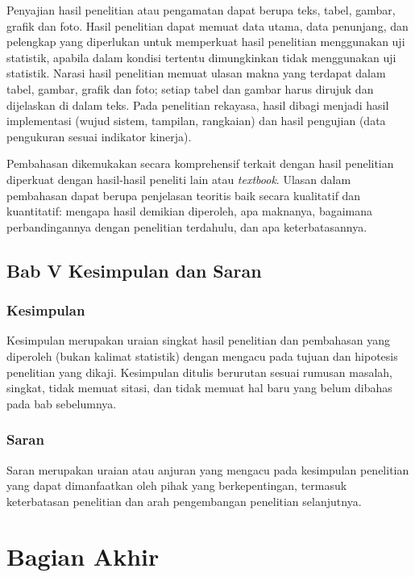 Penyajian hasil penelitian atau pengamatan dapat berupa teks, tabel, gambar, grafik dan foto. Hasil penelitian dapat memuat data utama, data penunjang, dan pelengkap yang diperlukan untuk memperkuat hasil penelitian menggunakan uji statistik, apabila dalam kondisi tertentu dimungkinkan tidak menggunakan uji statistik. Narasi hasil penelitian memuat ulasan makna yang terdapat dalam tabel, gambar, grafik dan foto; setiap tabel dan gambar harus dirujuk dan dijelaskan di dalam teks. Pada penelitian rekayasa, hasil dibagi menjadi hasil implementasi (wujud sistem, tampilan, rangkaian) dan hasil pengujian (data pengukuran sesuai indikator kinerja).

Pembahasan dikemukakan secara komprehensif terkait dengan hasil penelitian diperkuat dengan hasil-hasil peneliti lain atau \textit{textbook}. Ulasan dalam pembahasan dapat berupa penjelasan teoritis baik secara kualitatif dan kuantitatif: mengapa hasil demikian diperoleh, apa maknanya, bagaimana perbandingannya dengan penelitian terdahulu, dan apa keterbatasannya.

\subsection{Bab V Kesimpulan dan Saran}
\subsubsection{Kesimpulan}
Kesimpulan merupakan uraian singkat hasil penelitian dan pembahasan yang diperoleh (bukan kalimat statistik) dengan mengacu pada tujuan dan hipotesis penelitian yang dikaji. Kesimpulan ditulis berurutan sesuai rumusan masalah, singkat, tidak memuat sitasi, dan tidak memuat hal baru yang belum dibahas pada bab sebelumnya.

\subsubsection{Saran}
Saran merupakan uraian atau anjuran yang mengacu pada kesimpulan penelitian yang dapat dimanfaatkan oleh pihak yang berkepentingan, termasuk keterbatasan penelitian dan arah pengembangan penelitian selanjutnya.

\section{Bagian Akhir}

